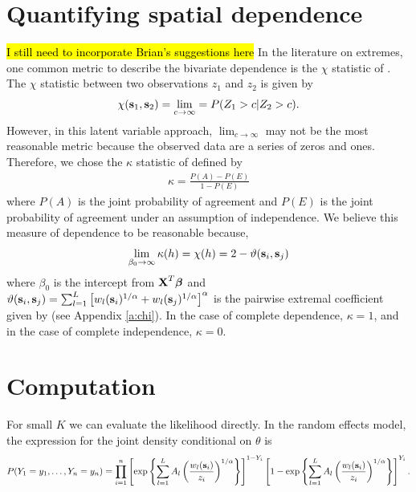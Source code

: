 \documentclass[11pt]{article}
\begin{document}
\section{Quantifying spatial dependence}
\hl{I still need to incorporate Brian's suggestions here}
In the literature on extremes, one common metric to describe the bivariate dependence is the $\chi$ statistic of \citet{Coles1999}.
The $\chi$ statistic between two observations $z_1$ and $z_2$ is given by
\begin{align}
  \chi(\mbox{\bf s}_1, \mbox{\bf s}_2) = \lim_{c \rightarrow \infty} = P(Z_1 > c | Z_2 > c).
\end{align}
However, in this latent variable approach, $\lim_{c \rightarrow \infty}$ may not be the most reasonable metric because the observed data are a series of zeros and ones.
Therefore, we chose the $\kappa$ statistic of \citet{Cohen1960} defined by
\begin{align}
  \kappa = \frac{P(A) - P(E)}{1 - P(E)}
\end{align}
where $P(A)$ is the joint probability of agreement and $P(E)$ is the joint probability of agreement under an assumption of independence.
We believe this measure of dependence to be reasonable because,
\begin{align}
  \lim_{\beta_0 \rightarrow \infty} \kappa(h) = \chi(h) = 2 - \vartheta(\mbox{\bf s}_i, \mbox{\bf s}_j)
\end{align}
where $\beta_0$ is the intercept from $\mbox{\bf X}^T\mbox{\boldmath $\beta$}$ and $\vartheta (\mbox{\bf s}_i, \mbox{\bf s}_j) = \sum_{ l = 1 }^{ L } \left[ w_{l}(\mbox{\bf s}_i)^{ 1/\alpha } +  w_{ l}(\mbox{\bf s}_j)^{ 1/\alpha } \right]^\alpha$ is the pairwise extremal coefficient given by \citet{Reich2012} (see Appendix \ref{a:chi}).
In the case of complete dependence, $\kappa = 1$, and in the case of complete independence, $\kappa = 0$.

\section{Computation}\label{s:comp}
For small $K$ we can evaluate the likelihood directly.
In the random effects model, the expression for the joint density conditional on $\theta$ is
\begin{align}
	P(Y_1=y_1,\ldots,Y_n=y_n) = \prod_{ i = 1 }^{ n } \left[ \exp \left\{ \sum_{ l = 1 }^{L} A_l \left( \frac{ w_{l}(\mbox{\bf s}_i) }{ z_i } \right)^{ 1/\alpha} \right\} \right]^{ 1 - Y_i } \left[ 1 - \exp \left\{ \sum_{ l = 1 }^{L} A_l \left( \frac{ w_{l}(\mbox{\bf s}_i) }{ z_i } \right)^{ 1/\alpha} \right\} \right]^{ Y_i }.
\end{align}
\end{document}
